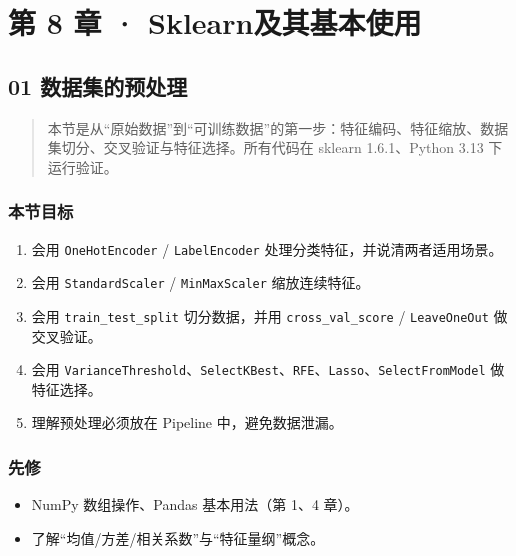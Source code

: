 \chapter{第 8 章 ·
Sklearn及其基本使用}\label{ux7b2c-8-ux7ae0-sklearnux53caux5176ux57faux672cux4f7fux7528}

\section{01
数据集的预处理}\label{ux6570ux636eux96c6ux7684ux9884ux5904ux7406}

\begin{quote}
本节是从``原始数据''到``可训练数据''的第一步：特征编码、特征缩放、数据集切分、交叉验证与特征选择。所有代码在
sklearn 1.6.1、Python 3.13 下运行验证。
\end{quote}

\subsection{本节目标}\label{ux672cux8282ux76eeux6807-28}

\begin{enumerate}
\def\labelenumi{\arabic{enumi}.}
\tightlist
\item
  会用 \texttt{OneHotEncoder} / \texttt{LabelEncoder}
  处理分类特征，并说清两者适用场景。
\item
  会用 \texttt{StandardScaler} / \texttt{MinMaxScaler} 缩放连续特征。
\item
  会用 \texttt{train\_test\_split} 切分数据，并用
  \texttt{cross\_val\_score} / \texttt{LeaveOneOut} 做交叉验证。
\item
  会用
  \texttt{VarianceThreshold}、\texttt{SelectKBest}、\texttt{RFE}、\texttt{Lasso}、\texttt{SelectFromModel}
  做特征选择。
\item
  理解预处理必须放在 Pipeline 中，避免数据泄漏。
\end{enumerate}

\subsection{先修}\label{ux5148ux4fee-21}

\begin{itemize}
\tightlist
\item
  NumPy 数组操作、Pandas 基本用法（第 1、4 章）。
\item
  了解``均值/方差/相关系数''与``特征量纲''概念。
\end{itemize}

